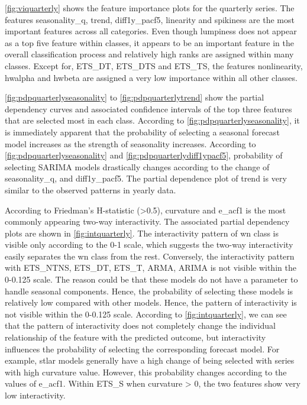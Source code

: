 \documentclass[11pt,a4paper,]{article}
\begin{document}
\autoref{fig:viquarterly} shows the feature importance plots for the quarterly series. The features seasonality\_q, trend, diff1y\_pacf5, linearity and spikiness are the most important features across all categories. Even though lumpiness does not appear as a top five feature within classes, it appears to be an important feature in the overall classification process and relatively high ranks are assigned within many classes. Except for, ETS\_DT, ETS\_DTS and ETS\_TS, the features nonlinearity, hwalpha and hwbeta are assigned a very low importance within all other classes.

\autoref{fig:pdpquarterlyseasonality} to \autoref{fig:pdpquarterlytrend} show the partial dependency curves and associated confidence intervals of the top three features that are selected most in each class. According to \autoref{fig:pdpquarterlyseasonality}, it is immediately apparent that the probability of selecting a seasonal forecast model increases as the strength of seasonality increases. According to \autoref{fig:pdpquarterlyseasonality} and \autoref{fig:pdpquarterlydiff1ypacf5}, probability of selecting SARIMA models drastically changes according to the change of seasonality\_q, and diff1y\_pacf5. The partial dependence plot of trend is very similar to the observed patterns in yearly data.

According to Friedman's H-statistic (\textgreater{}0.5), curvature and e\_acf1 is the most commonly appearing two-way interactivity. The associated partial dependency plots are shown in \autoref{fig:intquarterly}. The interactivity pattern of wn class is visible only according to the 0-1 scale, which suggests the two-way interactivity easily separates the wn class from the rest. Conversely, the interactivity pattern with ETS\_NTNS, ETS\_DT, ETS\_T, ARMA, ARIMA is not visible within the 0-0.125 scale. The reason could be that these models do not have a parameter to handle seasonal components. Hence, the probability of selecting these models is relatively low compared with other models. Hence, the pattern of interactivity is not visible within the 0-0.125 scale. According to \autoref{fig:intquarterly}, we can see that the pattern of interactivity does not completely change the individual relationship of the feature with the predicted outcome, but interactivity influences the probability of selecting the corresponding forecast model. For example, stlar models generally have a high change of being selected with series with high curvature value. However, this probability changes according to the values of e\_acf1. Within ETS\_S when curvature \textgreater{} 0, the two features show very low interactivity.
\end{document}
